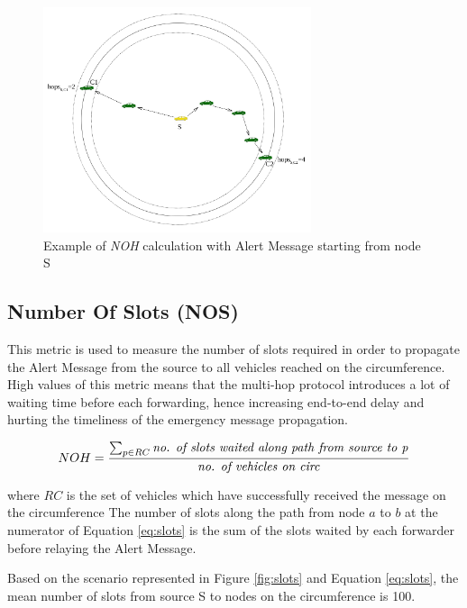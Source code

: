 			\begin{figure}[H]
				\centering
				\includegraphics[width=0.7\textwidth]{immagini/hops}
				\caption{Example of \textit{NOH} calculation with Alert Message starting from node S}
				\label{fig:hops}
			\end{figure}
			
		\subsection{Number Of Slots (NOS)}
			This metric is used to measure the number of slots required in order to propagate the Alert Message from the source to all vehicles reached on the circumference. High values of this metric means that the multi-hop protocol introduces a lot of waiting time before each forwarding, hence increasing end-to-end delay and hurting the timeliness of the emergency message propagation.
		
			\begin{gather}
				\label{eq:slots}
				NOH = \frac{ \sum_{p \in RC } \textrm{\textit{no. of slots waited along path from source to p}}} {\textrm{\textit{no. of vehicles on circ}}}
			\end{gather}	
	
			where $RC$ is the set of vehicles which have successfully received the message on the circumference
			The number of slots along the path from node $a$ to $b$ at the numerator of Equation \ref{eq:slots} is the sum of the slots waited by each forwarder before relaying the Alert Message. 
			
			
			Based on the scenario represented in Figure \ref{fig:slots} and Equation \ref{eq:slots}, the mean number of slots from source S to nodes on the circumference is 100.
			
